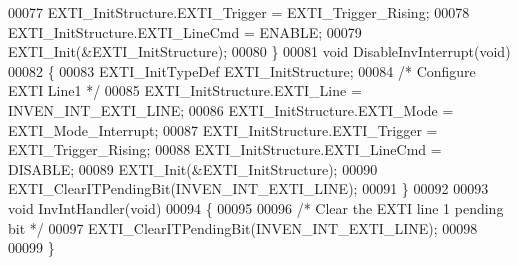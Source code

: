 \begin{DoxyCode}
00077   EXTI\_InitStructure.EXTI_Trigger = EXTI_Trigger_Rising;
00078   EXTI\_InitStructure.EXTI_LineCmd = ENABLE;
00079   EXTI_Init(&EXTI\_InitStructure);
00080 \}
00081 \textcolor{keywordtype}{void} DisableInvInterrupt(\textcolor{keywordtype}{void})
00082 \{
00083   EXTI\_InitTypeDef   EXTI\_InitStructure;
00084     \textcolor{comment}{/* Configure EXTI Line1 */}
00085   EXTI\_InitStructure.EXTI_Line = INVEN_INT_EXTI_LINE;
00086   EXTI\_InitStructure.EXTI_Mode = EXTI_Mode_Interrupt;
00087   EXTI\_InitStructure.EXTI_Trigger = EXTI_Trigger_Rising;
00088   EXTI\_InitStructure.EXTI_LineCmd = DISABLE;
00089   EXTI_Init(&EXTI\_InitStructure);
00090   EXTI_ClearITPendingBit(INVEN_INT_EXTI_LINE);
00091 \}
00092 
00093 \textcolor{keywordtype}{void} InvIntHandler(\textcolor{keywordtype}{void})
00094 \{
00095 
00096   \textcolor{comment}{/* Clear the EXTI line 1 pending bit */}
00097    EXTI_ClearITPendingBit(INVEN_INT_EXTI_LINE);
00098 
00099 \}
\end{DoxyCode}
